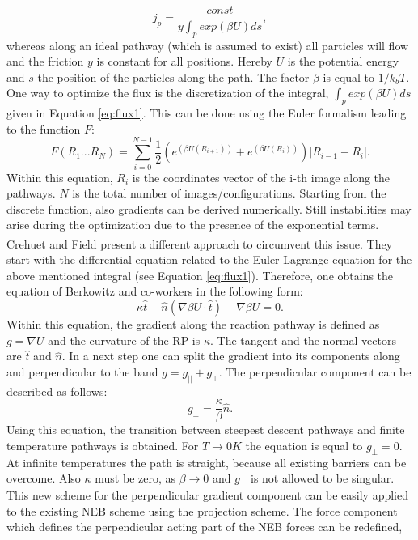 \documentclass[a4paper,11pt]{scrartcl}
\newcommand{\myCite}[1]{\textsuperscript{\cite{#1}}}
\begin{document}
\begin{itemize}
		\begin{equation}
		j_{p} = \frac{const}{y\int_{p}exp(\beta U)ds},
		\label{eq:flux1}
			\end{equation}
		whereas along an ideal pathway (which is assumed to exist) all particles will flow and the friction $y$ is constant for all positions. Hereby $U$ is the potential energy and $s$ the position of the particles along the path. The factor $\beta$ is equal to $ 1/k_{b}T$. One way to optimize the flux is the discretization of the integral, $ \int_{p} exp(\beta U)ds$ given in Equation \ref{eq:flux1}. This can be done using the Euler formalism leading to the function $F$:
		\begin{equation}
		 F(R_{1}...R_{N})=\sum^{N-1}_{i=0}\frac{1}{2}(e^{(\beta U (R_{i+1}))} + e^{(\beta U (R_{i}))})\left|R_{i-1}-R_{i}\right|.
		\end{equation}
		Within this equation, $ R_{i} $ is the coordinates vector of the i-th image along the pathways. $N$ is the total number of images/configurations. Starting from the discrete function, also gradients can be derived numerically. Still instabilities may arise during the optimization due to the presence of the exponential terms. Crehuet and Field\myCite{Crehuet2003a} present a different approach to circumvent this issue. They start with the differential equation related to the Euler-Lagrange equation for the above mentioned integral (see Equation \ref{eq:flux1}). Therefore, one obtains the equation of Berkowitz and co-workers in the following form:		
		\begin{equation}
		\kappa \hat{t} + \hat{n} (\nabla \beta U \cdot \hat{t})-\nabla \beta U = 0.	
		\end{equation}
	Within this equation, the gradient along the reaction pathway is defined as $ g = \nabla U$ and the curvature of the RP is $\kappa$. The tangent and the normal vectors are $\hat{t}$ and $\hat{n}$. In a next step one can split the gradient into its components along and perpendicular to the band $ g = g_{||} + g_{\bot} $. The perpendicular component can be described as follows:	
	\begin{equation}
	g_{\bot}=\frac{\kappa}{\beta} \hat{n}.
	\end{equation}
	Using this equation, the transition between steepest descent pathways and finite temperature pathways is obtained. For $T\rightarrow 0K$ the equation is equal to $ g_{\bot}=0$. At infinite temperatures the path is straight, because all existing barriers can be overcome. Also $\kappa$ must be zero, as $ \beta \rightarrow 0$ and $g_{\bot}$ is not allowed to be singular. This new scheme for the perpendicular gradient component can be easily applied to the existing NEB scheme using the projection scheme. The force component which defines the perpendicular acting part of the NEB forces can be redefined,

\end{itemize}
\end{document}
